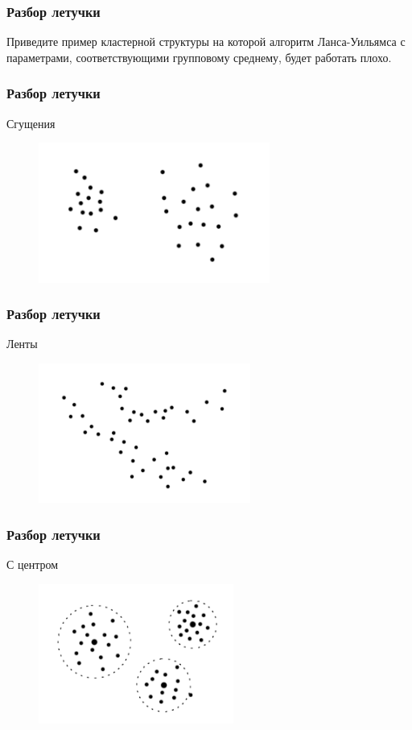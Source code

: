 \documentclass[12pt]{beamer}
\begin{document}
\begin{frame}\frametitle{Разбор летучки}
Приведите пример кластерной структуры на которой алгоритм Ланса-Уильямса с
параметрами, соответствующими групповому среднему, будет работать плохо.
\end{frame}

\begin{frame}\frametitle{Разбор летучки}
Сгущения\\
\vspace{5mm}
\begin{figure}[htbp]
  \includegraphics[height=130pt, keepaspectratio = true]{images/cluster1}  
\end{figure}
\end{frame}

\begin{frame}\frametitle{Разбор летучки}
Ленты\\
\vspace{5mm}
\begin{figure}[htbp]
  \includegraphics[height=130pt, keepaspectratio = true]{images/cluster2}  
\end{figure}
\end{frame}

\begin{frame}\frametitle{Разбор летучки}
С центром\\
\vspace{5mm}
\begin{figure}[htbp]
  \includegraphics[height=130pt, keepaspectratio = true]{images/cluster3}  
\end{figure}
\end{frame}
\end{document}
